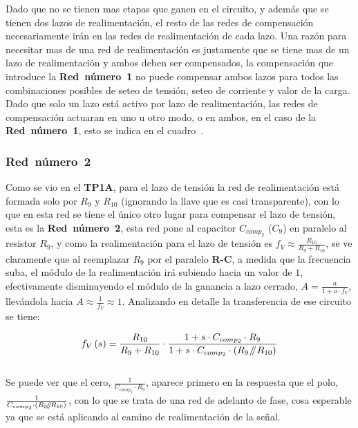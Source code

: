 Dado que no se tienen mas etapas que ganen en el circuito, y además que se tienen dos lazos de realimentación, el resto de las redes de compensación necesariamente irán en las redes de realimentación de cada lazo. Una razón para necesitar mas de una red de realimentación es justamente que se tiene mas de un lazo de realimentación y ambos deben ser compensados, la compensación que introduce la \textbf{Red~número~1} no puede compensar ambos lazos para todos las combinaciones posibles de seteo de tensión, seteo de corriente y valor de la carga. Dado que solo un lazo está activo por lazo de realimentación, las redes de compensación actuaran en uno u otro modo, o en ambos, en el caso de la \textbf{Red~número~1}, esto se indica en el cuadro~.

\subsubsection{\textbf{Red~número~2}}

Como se vio en el \textbf{TP1A}, para el lazo de tensión la red de realimentación está formada solo por $R_{9}$ y $R_{10}$ (ignorando la llave que es casi transparente), con lo que en esta red se tiene el único otro lugar para compensar el lazo de tensión, esta es la \textbf{Red~número~2}, esta red pone al capacitor $C_{comp_{2}}$ ($C_{9}$) en paralelo al resistor $R_{9}$, y como la realimentación para el lazo de tensión es $f_{V} \approx \frac{R_{10}}{R_{9} + R_{10}}$, se ve claramente que al reemplazar $R_{9}$ por el paralelo \textbf{R-C}, a medida que la frecuencia suba, el módulo de la realimentación irá subiendo hacia un valor de $1$, efectivamente disminuyendo el módulo de la ganancia a lazo cerrado, $ A = \frac{a}{1 + a \cdot f_{V}}$, llevándola hacia $A \approx \frac{1}{f_{V}} \approx 1$. Analizando en detalle la transferencia de ese circuito se tiene:


\begin{equation}
f_{V}\left(s\right) = \frac{R_{10}}{R_{9} + R_{10}}  \cdot \frac{1 + s \cdot C_{comp_{2}} \cdot R_{9}}{1 + s \cdot C_{comp_{2}} \cdot \left( R_{9} \mathbin{\!/\mkern-5mu/\!} R_{10}  \right)}
\end{equation}\\


 Se puede ver que el cero, $\frac{1}{  C_{comp_{2}} \cdot R_{9} }$, aparece primero en la respuesta que el polo, $\frac{1}{  C_{comp_{2}} \cdot \left( R_{9} \mathbin{\!/\mkern-5mu/\!} R_{10}  \right) }$, con lo que se trata de una red de adelanto de fase, cosa esperable ya que se está aplicando al camino de realimentación de la señal.\\


